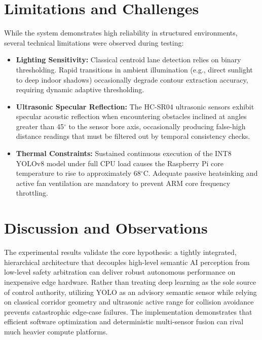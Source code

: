 \section{Limitations and Challenges}
While the system demonstrates high reliability in structured environments, several technical limitations were observed during testing:
\begin{itemize}
    \item \textbf{Lighting Sensitivity:} Classical centroid lane detection relies on binary thresholding. Rapid transitions in ambient illumination (e.g., direct sunlight to deep indoor shadows) occasionally degrade contour extraction accuracy, requiring dynamic adaptive thresholding.
    \item \textbf{Ultrasonic Specular Reflection:} The HC-SR04 ultrasonic sensors exhibit specular acoustic reflection when encountering obstacles inclined at angles greater than 45$^\circ$ to the sensor bore axis, occasionally producing false-high distance readings that must be filtered out by temporal consistency checks.
    \item \textbf{Thermal Constraints:} Sustained continuous execution of the INT8 YOLOv8 model under full CPU load causes the Raspberry Pi core temperature to rise to approximately 68$^\circ$C. Adequate passive heatsinking and active fan ventilation are mandatory to prevent ARM core frequency throttling.
\end{itemize}

\section{Discussion and Observations}
The experimental results validate the core hypothesis: a tightly integrated, hierarchical architecture that decouples high-level semantic AI perception from low-level safety arbitration can deliver robust autonomous performance on inexpensive edge hardware. Rather than treating deep learning as the sole source of control authority, utilizing YOLO as an advisory semantic sensor while relying on classical corridor geometry and ultrasonic active range for collision avoidance prevents catastrophic edge-case failures. The implementation demonstrates that efficient software optimization and deterministic multi-sensor fusion can rival much heavier compute platforms.

